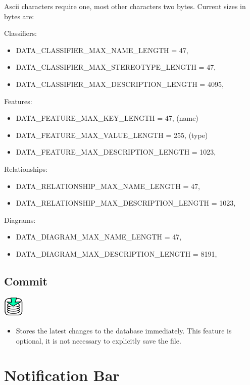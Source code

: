 Ascii characters require one, most other characters two bytes.
Current sizes in bytes are:

Classifiers:
\begin{itemize}
\item DATA\_CLASSIFIER\_MAX\_NAME\_LENGTH = 47,
\item DATA\_CLASSIFIER\_MAX\_STEREOTYPE\_LENGTH = 47,
\item DATA\_CLASSIFIER\_MAX\_DESCRIPTION\_LENGTH = 4095,
\end{itemize}

Features:
\begin{itemize}
\item DATA\_FEATURE\_MAX\_KEY\_LENGTH = 47,  (name)
\item DATA\_FEATURE\_MAX\_VALUE\_LENGTH = 255,  (type)
\item DATA\_FEATURE\_MAX\_DESCRIPTION\_LENGTH = 1023,
\end{itemize}

Relationships:
\begin{itemize}
\item DATA\_RELATIONSHIP\_MAX\_NAME\_LENGTH = 47,
\item DATA\_RELATIONSHIP\_MAX\_DESCRIPTION\_LENGTH = 1023,
\end{itemize}

Diagrams:
\begin{itemize}
\item DATA\_DIAGRAM\_MAX\_NAME\_LENGTH = 47,
\item DATA\_DIAGRAM\_MAX\_DESCRIPTION\_LENGTH = 8191,
\end{itemize}

\subsection{Commit}

\includegraphics[width=1cm]{../../gui/source/resources/edit_commit.pdf}
\begin{itemize}
\item Stores the latest changes to the database immediately. This feature is optional, it is not necessary to explicitly save the file.
\end{itemize}

\section{Notification Bar}

